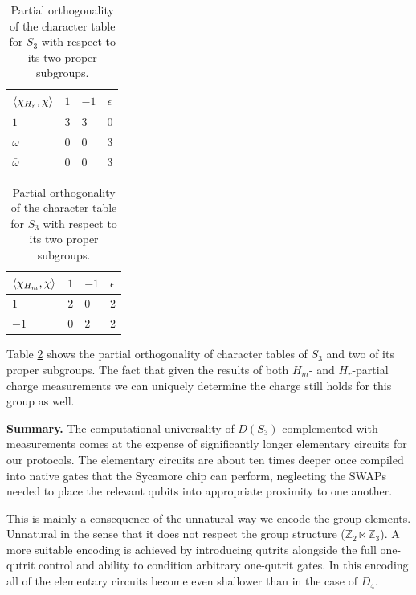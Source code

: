 \documentclass[a4paper,twocolumn,11pt, accepted=2024-06-14]{quantumarticle}
\begin{document}
\begin{table}[h]
\centering
\begin{tabular}{|l|lll|}\hline
  $\braket{\chi_{H_r}, \chi}$ & $1$ & $-1$ & $\epsilon$  \\ \hline
$1$ & 3   & 3            & 0                             \\ 
$\omega$ & 0   & 0            & 3                              \\ 
$\bar{\omega}$ & 0   & 0            & 3                          \\ \hline
\end{tabular}

\begin{tabular}{|l|lll|}\hline
  $\braket{\chi_{H_m}, \chi}$ & $1$ & $-1$ & $\epsilon$  \\ \hline
$1$ & 2   & 0            & 2                             \\ 
$-1$ & 0   & 2            & 2                              \\ \hline

\end{tabular}
\caption{Partial orthogonality of the character table for $S_3$ with respect to its two proper subgroups.}
\label{tab:red_ch_S3}
\end{table}

Table \ref{tab:red_ch_S3} shows the partial orthogonality of character tables of $S_3$ and two of its proper subgroups. The fact that given the results of both $H_m$- and $H_r$-partial charge measurements we can uniquely determine the charge still holds for this group as well. 

\textbf{Summary.}
The computational universality of $D(S_3)$ complemented with measurements comes at the expense of significantly longer elementary circuits for our protocols. The elementary circuits are about ten times deeper once compiled into native gates that the Sycamore chip can perform, neglecting the SWAPs needed to place the relevant qubits into appropriate proximity to one another.

This is mainly a consequence of the unnatural way we encode the group elements. Unnatural in the sense that it does not respect the group structure ($\mathbb{Z}_2 \ltimes \mathbb{Z}_3$). A more suitable encoding is achieved by introducing qutrits alongside the full one-qutrit control and ability to condition arbitrary one-qutrit gates. In this encoding all of the elementary circuits become even shallower than in the case of $D_4$. 
\end{document}
